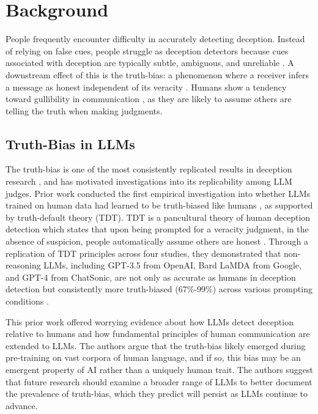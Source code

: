 \documentclass{article}
\begin{document}
\section{Background}
\label{sec:background}

People frequently encounter difficulty in accurately detecting deception. Instead of relying on false cues, people struggle as deception detectors because cues associated with deception are typically subtle, ambiguous, and unreliable \citep{depaulo_cues_2003, hartwig_why_2011}. A downstream effect of this is the truth-bias: a phenomenon where a receiver infers a message as honest independent of its veracity \citep{levine_truth-default_2014, mccornack_deception_1986}. Humans show a tendency toward gullibility in communication \citep{levine_duped_2020}, as they are likely to assume others are telling the truth when making judgments.

\subsection{Truth-Bias in LLMs}

The truth-bias is one of the most consistently replicated results in deception research \citep{levine_duped_2020}, and has motivated investigations into its replicability among LLM judges. Prior work conducted the first empirical investigation into whether LLMs trained on human data had learned to be truth-biased like humans \citep{markowitz_generative_2024}, as supported by truth-default theory (TDT). TDT is a pancultural theory of human deception detection which states that upon being prompted for a veracity judgment, in the absence of suspicion, people automatically assume others are honest \citep{levine_duped_2020, levine_truth-default_2014}. Through a replication of TDT principles across four studies, they demonstrated that non-reasoning LLMs, including GPT-3.5 from OpenAI, Bard LaMDA from Google, and GPT-4 from ChatSonic, are not only as accurate as humans in deception detection but consistently more truth-biased (67\%-99\%) across various prompting conditions \citep{markowitz_generative_2024}.

This prior work offered worrying evidence about how LLMs detect deception relative to humans and how fundamental principles of human communication are extended to LLMs. The authors argue that the truth-bias likely emerged during pre-training on vast corpora of human language, and if so, this bias may be an emergent property of AI rather than a uniquely human trait. The authors suggest that future research should examine a broader range of LLMs to better document the prevalence of truth-bias, which they predict will persist as LLMs continue to advance.
\end{document}

